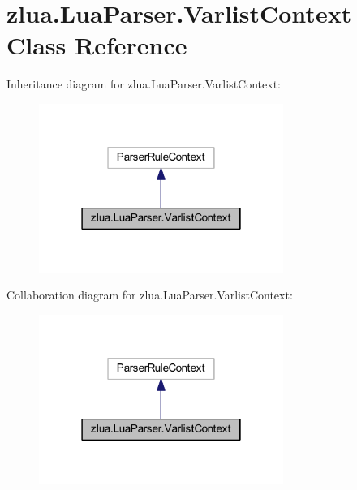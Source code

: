 \hypertarget{classzlua_1_1_lua_parser_1_1_varlist_context}{}\section{zlua.\+Lua\+Parser.\+Varlist\+Context Class Reference}
\label{classzlua_1_1_lua_parser_1_1_varlist_context}


Inheritance diagram for zlua.\+Lua\+Parser.\+Varlist\+Context\+:
\nopagebreak
\begin{figure}[H]
\begin{center}
\leavevmode
\includegraphics[width=226pt]{classzlua_1_1_lua_parser_1_1_varlist_context__inherit__graph}
\end{center}
\end{figure}


Collaboration diagram for zlua.\+Lua\+Parser.\+Varlist\+Context\+:
\nopagebreak
\begin{figure}[H]
\begin{center}
\leavevmode
\includegraphics[width=226pt]{classzlua_1_1_lua_parser_1_1_varlist_context__coll__graph}
\end{center}
\end{figure}
